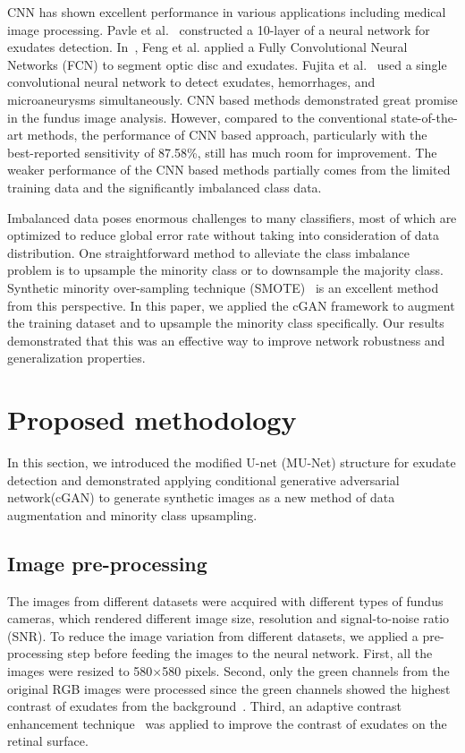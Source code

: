 \documentclass{osa-article}
\begin{document}
CNN has shown excellent performance in various applications including medical image processing. Pavle et al.~\cite{prentavsic2016detection} constructed a 10-layer of a neural network for exudates detection. In~\cite{feng2017deep}, Feng et al. applied a Fully Convolutional Neural Networks (FCN) to segment optic disc and exudates. Fujita et al.~\cite{tan2017automated} used a single convolutional neural network to detect exudates, hemorrhages, and microaneurysms simultaneously. CNN based methods demonstrated great promise in the fundus image analysis. However, compared to the conventional state-of-the-art methods, the performance of CNN based approach, particularly with the best-reported sensitivity of 87.58\%, still has much room for improvement. The weaker performance of the CNN based methods partially comes from the limited training data and the significantly imbalanced class data.

Imbalanced data poses enormous challenges to many classifiers, most of which are optimized to reduce global error rate without taking into consideration of data distribution. One straightforward method to alleviate the class imbalance problem is to upsample the minority class or to downsample the majority class. Synthetic minority over-sampling technique (SMOTE)~\cite{chawla2002smote} is an excellent method from this perspective. In this paper, we applied the cGAN framework to augment the training dataset and to upsample the minority class specifically. Our results demonstrated that this was an effective way to improve network robustness and generalization properties. 


\section{Proposed methodology}
In this section, we introduced the modified U-net (MU-Net) structure for exudate detection and demonstrated applying conditional generative adversarial network(cGAN) to generate synthetic images as a new method of data augmentation and minority class upsampling.

\subsection{Image pre-processing}
The images from different datasets were acquired with different types of fundus cameras, which rendered different image size, resolution and signal-to-noise ratio (SNR). To reduce the image variation from different datasets, we applied a pre-processing step before feeding the images to the neural network. First, all the images were resized to 580$\times$580 pixels. Second, only the green channels from the original RGB images were processed since the green channels showed the highest contrast of exudates from the background~\cite{gupta2016efficient}. Third, an adaptive contrast enhancement technique~\cite {sinthanayothin1999automated}  was applied to improve the contrast of exudates on the retinal surface.
\end{document}
